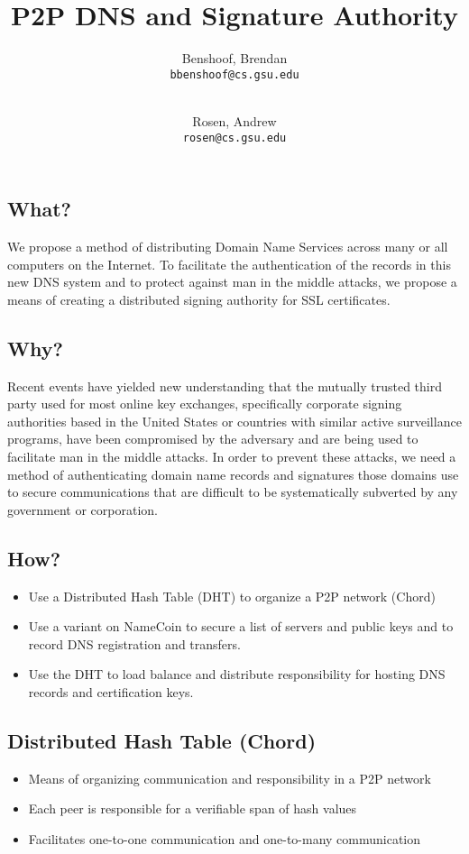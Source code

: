 \documentclass{IEEEtran}
\author{
  Benshoof, Brendan\\
  \texttt{bbenshoof@cs.gsu.edu}
  \and\\
  Rosen, Andrew\\
  \texttt{rosen@cs.gsu.edu}
}
\title{P2P DNS and Signature Authority}
\begin{document}
\maketitle
\subsection{What?}

We propose a method of distributing Domain Name Services across many or
all computers on the Internet. To facilitate the authentication of the
records in this new DNS system and to protect against man in the middle
attacks, we propose a means of creating a distributed signing authority
for SSL certificates.

\subsection{Why?}

Recent events have yielded new understanding that the mutually trusted
third party used for most online key exchanges, specifically corporate
signing authorities based in the United States or countries with similar
active surveillance programs, have been compromised by the adversary and
are being used to facilitate man in the middle attacks. In order to
prevent these attacks, we need a method of authenticating domain name
records and signatures those domains use to secure communications that
are difficult to be systematically subverted by any government or
corporation.

\subsection{How?}

\begin{itemize}
\item
  Use a Distributed Hash Table (DHT) to organize a P2P network (Chord)
\item
  Use a variant on NameCoin to secure a list of servers and public keys
  and to record DNS registration and transfers.
\item
  Use the DHT to load balance and distribute responsibility for hosting
  DNS records and certification keys.
\end{itemize}
\subsection{Distributed Hash Table (Chord)}

\begin{itemize}
\item
  Means of organizing communication and responsibility in a P2P network
\item
  Each peer is responsible for a verifiable span of hash values
\item
  Facilitates one-to-one communication and one-to-many communication
\end{itemize}
\end{document}
